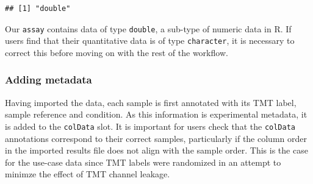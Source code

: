 \documentclass[9pt,a4paper,]{extarticle}
\newenvironment{Shaded}{\begin{snugshade}}{\end{snugshade}}
\newcommand{\DocumentationTok}[1]{\textcolor[rgb]{0.56,0.35,0.01}{\textbf{\textit{#1}}}}
\newcommand{\FunctionTok}[1]{\textcolor[rgb]{0.13,0.29,0.53}{\textbf{#1}}}
\newcommand{\NormalTok}[1]{#1}
\newcommand{\OtherTok}[1]{\textcolor[rgb]{0.56,0.35,0.01}{#1}}
\newcommand{\SpecialCharTok}[1]{\textcolor[rgb]{0.81,0.36,0.00}{\textbf{#1}}}
\newcommand{\StringTok}[1]{\textcolor[rgb]{0.31,0.60,0.02}{#1}}
\begin{document}
\begin{verbatim}
## [1] "double"
\end{verbatim}

Our \texttt{assay} contains data of type \texttt{double}, a sub-type of numeric data in R. If
users find that their quantitative data is of type \texttt{character}, it is necessary
to correct this before moving on with the rest of the workflow.

\subsubsection{Adding metadata}\label{adding-metadata}

Having imported the data, each sample is first annotated with its TMT label,
sample reference and condition. As this information is experimental metadata, it
is added to the \texttt{colData} slot. It is important for users check that the \texttt{colData}
annotations correspond to their correct samples, particularly if the column order
in the imported results file does not align with the sample order. This is the
case for the use-case data since TMT labels were randomized in an attempt to
minimze the effect of TMT channel leakage.

\begin{Shaded}
\end{Shaded}
\end{document}

